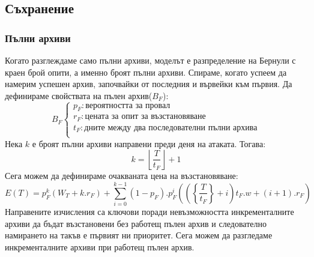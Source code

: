 \documentclass[11pt, a4paper]{article}
\theoremstyle{definition}
\begin{document}
	\subsection{Съхранение}
		
			\subsubsection{Пълни архиви}
				Когато разглеждаме само пълни архиви, моделът е разпределение на Бернули с краен брой опити, а именно броят пълни архиви. Спираме, когато успеем да намерим успешен архив, започвайки от последния и вървейки към първия. Да дефинираме свойствата на пълен архив($B_F$):
				$$
				B_F
				\begin{cases}
				p_F: \text{вероятността за провал}\\
				r_F: \text{цената за опит за възстановяване}\\
				t_F: \text{дните между два последователни пълни архива}\\
				\end{cases}
				$$
				Нека $k$ е броят пълни архиви направени преди деня на атаката. Тогава:
				$$
				k = \left \lfloor{\frac{T}{t_F}}\right \rfloor + 1
				$$
				Сега можем да дефинираме очакваната цена на възстановяване:
				\begin{equation}
					\label{eq:1}
					E(T) = p_F^{k}\left(W_T + k.r_F\right) + \displaystyle \sum_{i=0}^{k-1} 	(1-p_F).p_F^{i}\left( \left (\left\{ \frac{T}{t_F}\right \} + i\right)t_F.w + (i+1).r_F \right )
				\end{equation}
				Направените изчисления са ключови поради невъзможността инкременталните архиви да бъдат възстановени без работещ пълен архив и следователно намирането на такъв е първият ни приоритет. Сега можем да разгледаме инкременталните архиви при работещ пълен архив.
\end{document}
